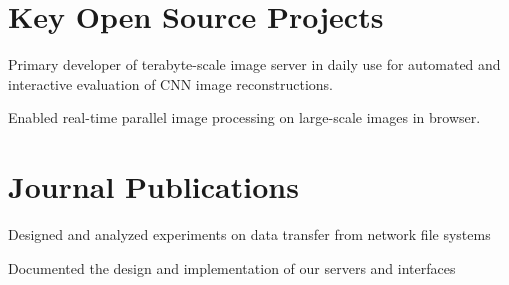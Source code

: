 \documentclass[]{deedy-resume-openfont}
\begin{document}
\begin{minipage}[t]{0.66\textwidth}
\section{Key Open Source Projects}
\begin{tightemize}
\item Primary developer of terabyte-scale image server in daily use for automated and interactive evaluation of CNN image reconstructions.
\end{tightemize}
\sectionsep
{}
\begin{tightemize}
\item Enabled real-time parallel image processing on large-scale images in browser.
\end{tightemize}
\sectionsep


\section{Journal Publications}
\begin{tightemize}
\item Designed and analyzed experiments on data transfer from network file systems
\item Documented the design and implementation of our servers and interfaces
\end{tightemize}
\sectionsep
\end{minipage} 

\end{document}
